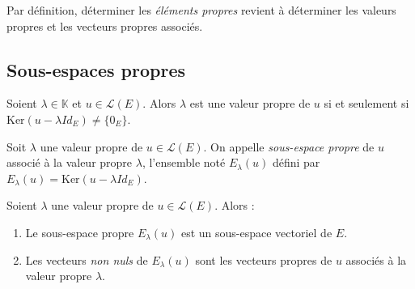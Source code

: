 \documentclass[french,11pt,twoside]{VcCours}
\begin{document}
\begin{Remarque}{} Par définition, déterminer les \emph{éléments propres} revient à déterminer les valeurs propres et les vecteurs propres associés.
\end{Remarque}

\subsection{Sous-espaces propres}

\begin{Proposition}{} Soient $\lambda \in \mathbb{K}$ et $u \in \mathcal{L}(E)$. Alors $\lambda$ est une valeur propre de $u$ si et seulement si $\textrm{Ker}(u- \lambda Id_E) \neq \lbrace 0_E \rbrace$.
\end{Proposition}

\begin{Demonstration}{}

\vspace{3cm}
\end{Demonstration} 

\begin{Definition}{} Soit $\lambda$ une valeur propre de $u \in \mathcal{L}(E)$. On appelle \emph{sous-espace propre} de $u$ associé à la valeur propre $\lambda$, l'ensemble noté $E_{\lambda}(u)$ défini par $E_{\lambda}(u)=\textrm{Ker}(u- \lambda Id_E)$.
\end{Definition}

\begin{Proposition}{} Soient $\lambda$ une valeur propre de $u \in \mathcal{L}(E)$. Alors :

\begin{enumerate}
\item Le sous-espace propre $E_{\lambda}(u)$ est un sous-espace vectoriel de $E$.
\item  Les vecteurs \emph{non nuls} de $E_{\lambda}(u)$ sont les vecteurs propres de $u$ associés à la valeur propre $\lambda$.
\end{enumerate} 
\end{Proposition}

\begin{Demonstration}{}

\vspace{3cm}
\end{Demonstration}
\end{document}
